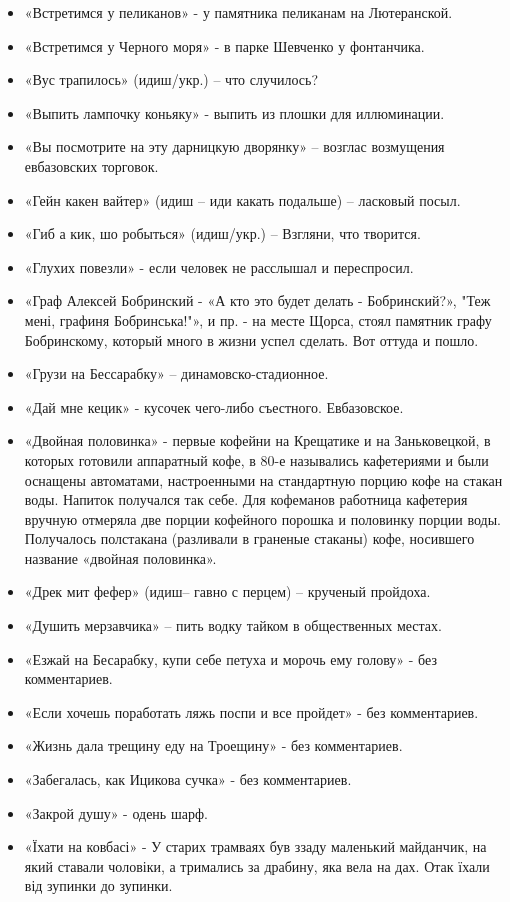 \begin{itemize}
\item  «Встретимся у пеликанов» - у памятника пеликанам  на Лютеранской.
\item  «Встретимся у Черного моря» -  в парке Шевченко у фонтанчика.
\item  «Вус трапилось» (идиш/укр.) – что случилось?
\item  «Выпить лампочку коньяку» -  выпить из плошки для иллюминации.
\item  «Вы посмотрите на эту дарницкую дворянку» – возглас возмущения евбазовских торговок.
\item  «Гейн какен вайтер» (идиш – иди какать подальше) – ласковый посыл.
\item  «Гиб а кик, шо робыться» (идиш/укр.) – Взгляни, что творится.
\item  «Глухих повезли» - если человек не расслышал и переспросил.
\item  «Граф Алексей Бобринский - «А кто это будет делать - Бобринский?», "Теж мені, графиня Бобринська!"», и пр. - на месте Щорса, стоял памятник графу Бобринскому, который много в жизни успел сделать. Вот оттуда и пошло.
\item  «Грузи на Бессарабку» – динамовско-стадионное.
\item  «Дай мне кецик» - кусочек чего-либо съестного. Евбазовское.
\item  «Двойная половинка» - первые кофейни на Крещатике и на Заньковецкой, в которых готовили аппаратный кофе, в 80-е назывались кафетериями и были оснащены автоматами, настроенными на стандартную порцию кофе на стакан воды. Напиток получался так себе. Для кофеманов работница кафетерия вручную отмеряла две порции кофейного порошка и половинку порции воды. Получалось полстакана (разливали в граненые стаканы) кофе, носившего название «двойная половинка». 
\item  «Дрек мит фефер» (идиш– гавно с перцем) – крученый пройдоха. 
\item  «Душить мерзавчика» – пить водку тайком в общественных местах.
\item  «Езжай на Бесарабку, купи себе петуха и морочь ему голову» - без комментариев.
\item  «Если хочешь поработать ляжь поспи и все пройдет» - без комментариев.
\item  «Жизнь дала трещину еду на Троещину» - без комментариев.
\item  «Забегалась, как Ицикова сучка» - без комментариев.
\item  «Закрой душу» - одень шарф.
\item  «Їхати на ковбасі»  - У старих трамваях був ззаду маленький майданчик, на який ставали чоловіки, а тримались за драбину, яка вела на дах. Отак їхали від зупинки до зупинки.

\end{itemize}

